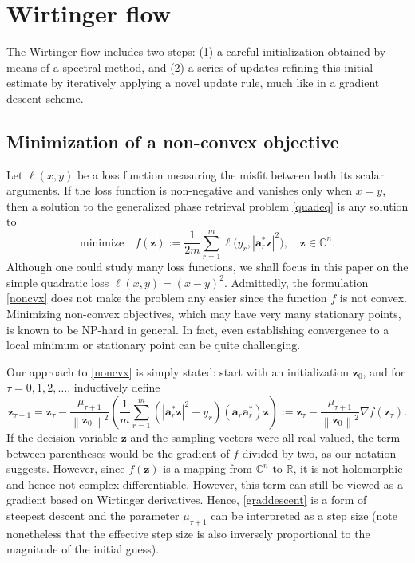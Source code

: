 \documentclass[conference,onecolumn,12pt]{IEEEtran}
\newcommand{\twonorm}[1]{\left\|#1\right\|}
\newcommand{\abs}[1]{\left|#1\right|}
\newcommand{\R}{\mathbb{R}}
\newcommand{\C}{\mathbb{C}}
\newcommand{\<}{\langle}
\renewcommand{\>}{\rangle}
\newcommand{\vct}[1]{\bm{#1}}
\numberwithin{equation}{section}
\begin{document}
\section{Wirtinger flow}
The Wirtinger flow includes two steps: (1) a careful initialization obtained by means of a spectral method, and (2) a series of updates refining this initial estimate by iteratively applying a novel update rule, much like in a gradient descent scheme. 
\subsection{Minimization of a non-convex objective}

Let $\ell(x,y)$ be a loss function measuring the misfit between both
its scalar arguments. If the loss function is non-negative and
vanishes only when $x = y$, then a solution to the generalized phase
retrieval problem \eqref{quadeq} is any solution to
\begin{equation}
\label{noncvx}
\text{minimize} \quad f(\vct{z}):=\frac{1}{2m}\sum_{r=1}^m
\ell\bigl(y_r, \abs{\vct{a}_r^*\vct{z}}^2\bigr), \quad \vct{z} \in \C^n.  
\end{equation}
Although one could study many loss functions, we shall focus in this
paper on the simple quadratic loss $\ell(x,y)=(x-y)^2$. Admittedly,
the formulation \eqref{noncvx} does not make the problem any easier
since the function $f$ is not convex. Minimizing non-convex
objectives, which may have very many stationary points, is known to be
NP-hard in general.  In fact, even establishing convergence to a local
minimum or stationary point can be quite challenging.

Our approach to \eqref{noncvx} is simply stated: start with an
initialization $\vct{z}_0$, and for $\tau = 0, 1, 2, \ldots$,
inductively define
\begin{equation}
\label{graddescent}
\vct{z}_{\tau+1}=\vct{z}_\tau-\frac{\mu_{\tau+1}}{\twonorm{\vct{z}_0}^2}\left(\frac{1}{m}\sum_{r=1}^m\left(\abs{\vct{a}_r^*\vct{z}}^2-y_r\right)(\vct{a}_r\vct{a}_r^*)\vct{z}\right):=\vct{z}_\tau-\frac{\mu_{\tau+1}}{\twonorm{\vct{z}_0}^2}\nabla
f(\vct{z}_\tau). 
\end{equation}
If the decision variable $\vct{z}$ and the sampling vectors were all
real valued, the term between parentheses would be the gradient of
$f$ divided by two, as our notation suggests. However, since $f(\vct{z})$ is a
mapping from $\C^n$ to $\R$, it is not holomorphic and hence not
complex-differentiable. However, this term can still be viewed as a
gradient based on Wirtinger derivatives. Hence, \eqref{graddescent} is a form of steepest descent and the parameter $\mu_{\tau+1}$ can be interpreted as a step size (note nonetheless that the effective step size is also inversely proportional to the magnitude of the initial guess).
\end{document}

